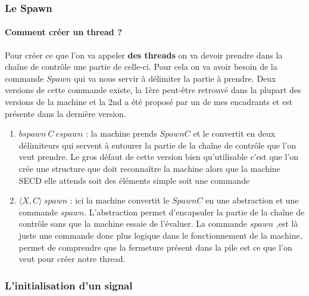 \documentclass[10pt,a4paper]{article}
\begin{document}
				\subsubsection{Le Spawn} 
				
					\paragraph{Comment créer un thread ?}
					Pour créer ce que l'on va appeler \textbf{des threads} on va devoir prendre dans la chaîne de contrôle une partie de celle-ci. Pour cela on va avoir besoin de la commande $Spawn$ qui va nous servir à délimiter la partie à prendre. Deux versions de cette commande existe, la 1ère peut-être retrouvé dans la plupart des versions de la machine et la 2nd a été proposé par un de mes encadrants et est présente dans la dernière version.
					\smallbreak
					\begin{enumerate}
						\item $bspawn~C~espawn$ : la machine prends $Spawn C$ et le convertit en deux délimiteurs qui servent à entourer la partie de la chaîne de contrôle que l'on veut prendre. Le gros défaut de cette version bien qu'utilisable c'est que l'on crée une structure que doit reconnaître la machine alors que la machine SECD elle attends soit des éléments simple soit une commande
						\item $\langle X,C\rangle~spawn$ : ici la machine convertit le $Spawn C$ en une abstraction et une commande $spawn$. L'abstraction permet d'encapsuler la partie de la chaîne de contrôle sans que la machine essaie de l'évaluer. La commande $spawn$ ,est là juste une commande donc plus logique dans le fonctionnement de la machine, permet de comprendre que la fermeture présent dans la pile est ce que l'on veut pour créer notre thread. 
					\end{enumerate}
					\medbreak
					
					
					
				\subsubsection{L'initialisation d'un signal}
					
\end{document}
